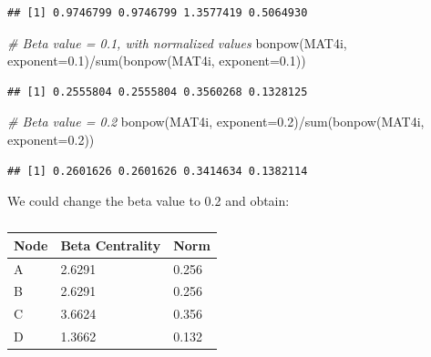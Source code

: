 \documentclass[
  notitlepage,
  onecolumn,
  openany]{book}
\newenvironment{Shaded}{\begin{snugshade}}{\end{snugshade}}
\newcommand{\AttributeTok}[1]{\textcolor[rgb]{0.77,0.63,0.00}{#1}}
\newcommand{\CommentTok}[1]{\textcolor[rgb]{0.56,0.35,0.01}{\textit{#1}}}
\newcommand{\FloatTok}[1]{\textcolor[rgb]{0.00,0.00,0.81}{#1}}
\newcommand{\FunctionTok}[1]{\textcolor[rgb]{0.00,0.00,0.00}{#1}}
\newcommand{\NormalTok}[1]{#1}
\newcommand{\SpecialCharTok}[1]{\textcolor[rgb]{0.00,0.00,0.00}{#1}}
\begin{document}
\begin{verbatim}
## [1] 0.9746799 0.9746799 1.3577419 0.5064930
\end{verbatim}

\begin{Shaded}
\begin{Highlighting}[]
\CommentTok{\# Beta value = 0.1, with normalized values}
\FunctionTok{bonpow}\NormalTok{(MAT4i, }\AttributeTok{exponent=}\FloatTok{0.1}\NormalTok{)}\SpecialCharTok{/}\FunctionTok{sum}\NormalTok{(}\FunctionTok{bonpow}\NormalTok{(MAT4i, }\AttributeTok{exponent=}\FloatTok{0.1}\NormalTok{))}
\end{Highlighting}
\end{Shaded}

\begin{verbatim}
## [1] 0.2555804 0.2555804 0.3560268 0.1328125
\end{verbatim}

\begin{Shaded}
\begin{Highlighting}[]
\CommentTok{\# Beta value = 0.2}
\FunctionTok{bonpow}\NormalTok{(MAT4i, }\AttributeTok{exponent=}\FloatTok{0.2}\NormalTok{)}\SpecialCharTok{/}\FunctionTok{sum}\NormalTok{(}\FunctionTok{bonpow}\NormalTok{(MAT4i, }\AttributeTok{exponent=}\FloatTok{0.2}\NormalTok{))}
\end{Highlighting}
\end{Shaded}

\begin{verbatim}
## [1] 0.2601626 0.2601626 0.3414634 0.1382114
\end{verbatim}

We could change the beta value to 0.2 and obtain:

\begin{table}[h]
\centering
\begin{tabular}{@{}lll@{}}
\toprule
\textbf{Node} & \textbf{Beta Centrality} & \textbf{Norm} \\ \midrule
A             & 2.6291                   & 0.256         \\
B             & 2.6291                   & 0.256         \\
C             & 3.6624                   & 0.356         \\
D             & 1.3662                   & 0.132         \\ \bottomrule
\end{tabular}
\caption{}
\label{tab:my-table}
\end{table}
\end{document}
